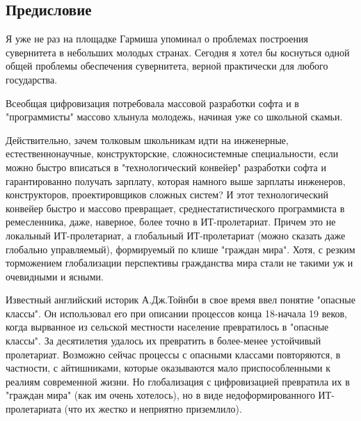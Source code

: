 \begin{partbacktext}
\part*{Предисловие}
\label{part_preface}

Я уже не раз на площадке Гармиша упоминал о проблемах построения сувернитета в небольших молодых странах. Сегодня я хотел бы коснуться одной общей проблемы обеспечения сувернитета, верной практически для любого государства.

Всеобщая  цифровизация потребовала массовой разработки софта и в "программисты"{} массово хлынула молодежь, начиная уже со школьной скамьи.

Действительно, зачем толковым школьникам идти на инженерные, естественнонаучные, конструкторские, сложносистемные специальности, если можно быстро вписаться в "технологический конвейер"{} разработки софта и гарантированно получать зарплату, которая намного выше зарплаты инженеров, конструкторов, проектировщиков сложных систем? И этот технологический конвейер быстро и массово превращает, среднестатистического программиста в ремесленника, даже, наверное, более точно в ИТ-пролетариат. Причем это не локальный ИТ-пролетариат, а глобальный ИТ-пролетариат (можно сказать даже глобально управляемый), формируемый по клише "граждан мира"{}. Хотя, с резким торможением глобализации перспективы гражданства мира стали  не такими уж и очевидными и ясными.

Известный английский историк А.Дж.Тойнби в свое время ввел понятие "опасные классы"{}. Он использовал его при  описании процессов конца 18-начала 19 веков, когда вырванное из сельской местности население превратилось в "опасные классы"{}. За десятилетия удалось их превратить в более-менее устойчивый пролетариат. Возможно сейчас процессы с опасными классами повторяются, в частности, с айтишниками, которые оказываются мало приспособленными к реалиям современной жизни. Но глобализация с цифровизацией превратила их в "граждан мира"{} (как им очень хотелось), но в виде недоформированного ИТ-пролетариата (что их жестко и неприятно приземлило). 


\end{partbacktext}
